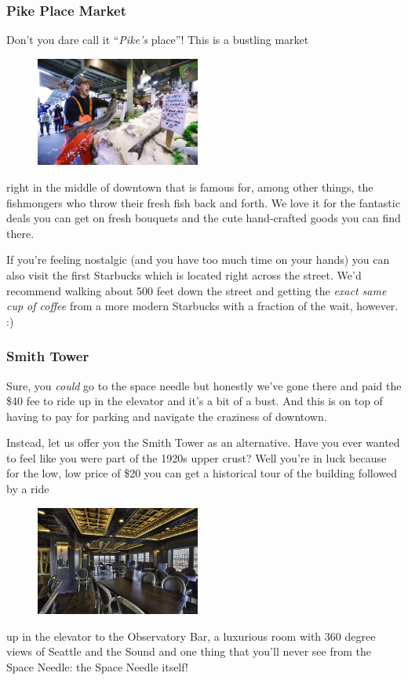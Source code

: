 \documentclass[10pt]{article}
\begin{document}
\subsubsection{Pike Place Market}
Don't you dare call it ``\textit{Pike's} place''! This is a bustling market 
\begin{figure}
    \centering
    \includegraphics[width=0.48\textwidth]{fish.jpg}
\end{figure}
right in the middle
of downtown that is famous for, among other things, the fishmongers who throw their fresh
fish back and forth. We love it for the fantastic deals you can get on fresh bouquets and the
cute hand-crafted goods you can find there.

If you're feeling nostalgic (and you have too much time on your hands) you can also visit the first Starbucks
which is located right across the street. We'd recommend walking about 500 feet down the street
and getting the \textit{exact same cup of coffee} from a more modern Starbucks with a fraction of the wait, however. :)

\subsubsection{Smith Tower}
Sure, you \textit{could} go to the space needle but honestly we've gone there and paid the \$40 fee to ride up in
the elevator and it's a bit of a bust. And this is on top of having to pay for parking and navigate the craziness
of downtown.

Instead, let us offer you the Smith Tower as an alternative. Have you ever wanted to feel like you 
were part of the 1920s upper crust? Well you're in luck because for the low, low price of \$20 you 
can get a historical tour of the building followed by a ride
\begin{figure}
    \centering
    \includegraphics[width=0.48\textwidth]{smith.jpg}
\end{figure}
 up in the elevator to the Observatory Bar,
a luxurious room with 360 degree views of Seattle and the Sound and one thing that you'll 
never see from the Space Needle: the Space Needle itself!
\end{document}
